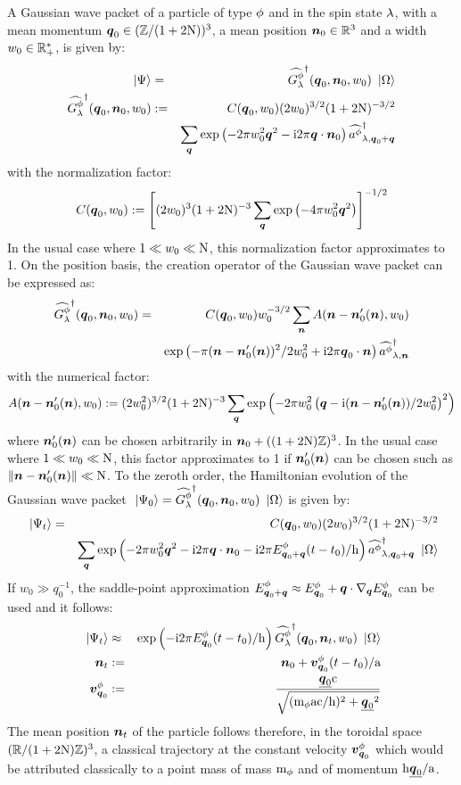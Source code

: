 \documentclass[10pt,a4paper,twoside,openany]{book}
\begin{document}
A Gaussian wave packet of a particle of type $\pt$ and in the spin state $\sp$, with a mean momentum $\q_0 \in (\IZ/(1+2\N))^3$, a mean position $\n_0 \in \IR^3$ and a width $w_0 \in \IR_+^*$, is given by:
\begin{eqnarray*}
\ket \Psi & = & \dop{G^\pt_\sp}(\q_0,\n_0,w_0) \ket \vac \\
\dop{G^\pt_\sp}(\q_0,\n_0,w_0) & \eqdef & C(\q_0,w_0) (2w_0)^{3/2} (1+2\N)^{-3/2} \\
&& \sum_{\q} \exp{-2 \pi w_0^2 \q^2 - \i 2 \pi \q \ssp \n_0} \cop\pt\sp{\q_0+\q}
\end{eqnarray*}
with the normalization factor:
\begin{equation*}
C(\q_0,w_0) \eqdef \left[ (2w_0)^3 (1+2\N)^{-3} \sum_{\q} \exp{-4 \pi w_0^2 \q^2} \right]^{-1/2}
\end{equation*}
In the usual case where $1 \ll w_0 \ll \N$, this normalization factor approximates to 1. On the position basis, the creation operator of the Gaussian wave packet can be expressed as:
\begin{eqnarray*}
\dop{G^\pt_\sp}(\q_0,\n_0,w_0) & = & C(\q_0,w_0) w_0^{-3/2} \sum_{\n} A(\n - \n_0'(\n),w_0) \\
&& \exp{-\pi (\n - \n_0'(\n))^2/2 w_0^2 + \i 2 \pi \q_0 \ssp \n} \cop\pt\sp\n
\end{eqnarray*}
with the numerical factor:
\begin{equation*}
A(\n - \n_0'(\n),w_0) \eqdef (2w_0^2)^{3/2} (1+2\N)^{-3} \sum_{\q} \exp{-2 \pi w_0^2 \left( \q - \i (\n - \n_0'(\n))/2 w_0^2 \right)^2}
\end{equation*}
where $\n_0'(\n)$ can be chosen arbitrarily in $\n_0 + ((1+2\N) \IZ)^3$. In the usual case where $1 \ll w_0 \ll \N$, this factor approximates to 1 if $\n_0'(\n)$ can be chosen such as $\| \n-\n_0'(\n) \| \ll \N$. To the zeroth order, the Hamiltonian evolution of the Gaussian wave packet $\ket{\Psi_0} = \dop{G^\pt_\sp}(\q_0,\n_0,w_0) \ket \vac$ is given by:
\begin{eqnarray*}
\ket{\Psi_t} & = & C(\q_0,w_0) (2w_0)^{3/2} (1+2\N)^{-3/2} \\
&& \sum_{\q} \exp{-2 \pi w_0^2 \q^2 - \i 2 \pi \q \ssp \n_0 -\i 2 \pi \Ek \pt {\q_0+\q} (t - t_0) / \h} \cop\pt\sp{\q_0+\q} \ket \vac
\end{eqnarray*}
If $w_0 \gg q_0^{-1}$, the saddle-point approximation $\Ek \pt {\q_0+\q} \approx \Ek \pt {\q_0} + \q \ssp \nabla_{\q} \Ek \pt {\q_0}$ can be used and it follows:
\begin{eqnarray*}
\ket{\Psi_t} & \approx & \exp{-\i 2 \pi \Ek \pt {\q_0} (t - t_0) / \h} \dop{G^\pt_\sp}(\q_0,\n_t,w_0) \ket \vac \\
\n_t & \eqdef & \n_0 + \vk \pt {\q_0} (t - t_0) / \a \\
\vk \pt {\q_0} & \eqdef & \frac{\eqp{\q_0} \c}{\sqrt{(\mp \pt \a \c / \h)^2 + \eqp{\q_0}^2}}
\end{eqnarray*}
The mean position $\n_t$ of the particle follows therefore, in the toroidal space $(\IR / (1+2\N)\IZ)^3$,  a classical trajectory at the constant velocity $\vk \pt {\q_0}$ which would be attributed classically to a point mass of mass $\mp \pt$ and of momentum $\h \eqp{\q_0} / \a$.
\end{document}
